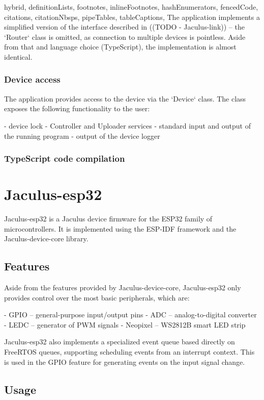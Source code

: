 \documentclass[
  digital,
  oneside,
  nosansbold,
  nocolorbold,
  lof,
  lot
]{fithesis4}
\begin{document}
\begin{markdown*}{%
  hybrid,
  definitionLists,
  footnotes,
  inlineFootnotes,
  hashEnumerators,
  fencedCode,
  citations,
  citationNbsps,
  pipeTables,
  tableCaptions,
}
The application implements a simplified version of the interface described in ((TODO - Jaculus-link)) -- the `Router` class is omitted, as connection to multiple devices is pointless. Aside from that and language choice (TypeScript), the implementation is almost identical.

\subsection{Device access}

The application provides access to the device via the `Device` class. The class exposes the following functionality to the user:

  - device lock
  - Controller and Uploader services
  - standard input and output of the running program
  - output of the device logger

\subsection{TypeScript code compilation}



\chapter{Jaculus-esp32}

Jaculus-esp32 is a Jaculus device firmware for the ESP32 family of microcontrollers. It is implemented using the ESP-IDF framework and the Jaculus-device-core library.

\section{Features}

Aside from the features provided by Jaculus-device-core, Jaculus-esp32 only provides control over the most basic peripherals, which are:

  - GPIO -- general-purpose input/output pins
  - ADC -- analog-to-digital converter
  - LEDC -- generator of PWM signals
  - Neopixel -- WS2812B smart LED strip

Jaculus-esp32 also implements a specialized event queue based directly on FreeRTOS queues, supporting scheduling events from an interrupt context. This is used in the GPIO feature for generating events on the input signal change.


\section{Usage}


\end{markdown*}
\end{document}
